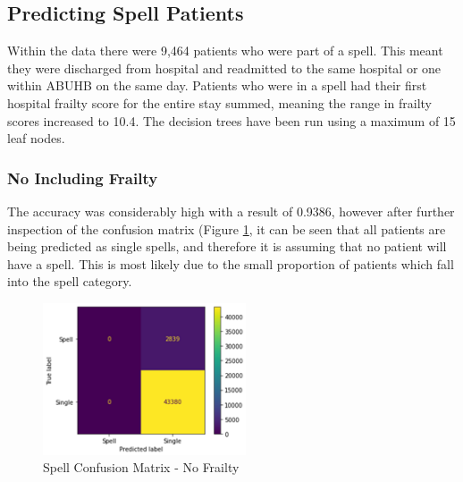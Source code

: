 \documentclass[../thesis.tex]{subfiles}
\begin{document}
\begin{table}[h!]
\centering{}
\caption{Combined CART Results}
\label{Tab:CombinedCART}

\end{table}



\subsection{Predicting Spell Patients}
Within the data there were 9,464 patients who were part of a spell. This meant they were discharged from hospital and readmitted to the same hospital or one within ABUHB on the same day. Patients who were in a spell had their first hospital frailty score for the entire stay summed, meaning the range in frailty scores increased to 10.4. The decision trees have been run using a maximum of 15 leaf nodes.

\subsubsection{No Including Frailty}
The accuracy was considerably high with a result of 0.9386, however after further inspection of the confusion matrix (Figure \ref{Fig:CM1}, it can be seen that all patients are being predicted as single spells, and therefore it is assuming that no patient will have a spell. This is most likely due to the small proportion of patients which fall into the spell category.
\begin{figure}[h!]
    \centering
    \includegraphics[width = 6cm]{Chapter4/Figures/Matrix1.png}
    \caption{Spell Confusion Matrix - No Frailty}
    \label{Fig:CM1}
\end{figure}
\end{document}
